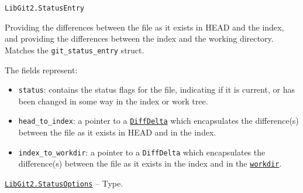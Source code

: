 \begin{adjustwidth}{2em}{0pt}


\begin{verbatim}
LibGit2.StatusEntry
\end{verbatim}

Providing the differences between the file as it exists in HEAD and the index, and providing the differences between the index and the working directory. Matches the \texttt{git\_status\_entry} struct.

The fields represent:

\begin{itemize}
\item \texttt{status}: contains the status flags for the file, indicating if it is current, or has been changed in some way in the index or work tree.


\item \texttt{head\_to\_index}: a pointer to a \hyperlink{9789233943804285928}{\texttt{DiffDelta}} which encapsulates the difference(s) between the file as it exists in HEAD and in the index.


\item \texttt{index\_to\_workdir}: a pointer to a \texttt{DiffDelta} which encapsulates the difference(s) between the file as it exists in the index and in the \hyperlink{6689577338311178757}{\texttt{workdir}}.

\end{itemize}


\end{adjustwidth}
\hypertarget{15761804013497693135}{} 
\hyperlink{15761804013497693135}{\texttt{LibGit2.StatusOptions}}  -- {Type.}

